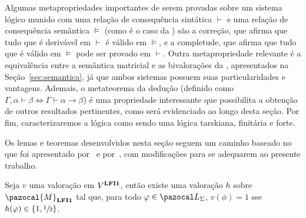     Algumas metapropriedades importantes de serem provadas sobre um sistema lógico munido com uma relação de consequência sintática $\vdash$ e uma relação de consequência semântica $\vDash$ (como é o caso da \lfium{}) são a correção, que afirma que tudo que é derivável em $\vdash$ é válido em $\vDash$, e a completude, que afirma que tudo que é válido em $\vDash$ pode ser provado em $\vdash$. Outra metapropriedade relevante é a equivalência entre a semântica matricial e as bivalorações da \lfium{}, apresentados na Seção~\ref{sec:semantica}, já que ambos sistemas possuem suas particularidades e vantagens. Ademais, o metateorema da dedução (definido como $\Gamma, \alpha \vdash \beta \Longleftrightarrow \Gamma \vdash \alpha \to \beta$) é uma propriedade interessante que possibilita a obtenção de outros resultados pertinentes, como será evidenciado ao longo desta seção. Por fim, caracterizaremos a lógica \lfium{} como sendo uma lógica tarskiana, finitária e \lfi{} forte.
    
    Os lemas e teoremas desenvolvidos nesta seção seguem um caminho baseado no que foi apresentado por~ e por~, com modificações para se adequarem ao presente trabalho.


    \begin{lema}\label{lem:matval}
        Seja $v$ uma valoração em $V^{{\normalfont\textbf{LFI1}}}$, então existe uma valoração $h$ sobre $\pazocal{M}_{\lfium}$ tal que, para todo $\phi \in \ling{}$, $v(\phi) = 1$ sse $h(\varphi) \in \{1, \sfrac{1}{2}{}\}$.
    \end{lema}

